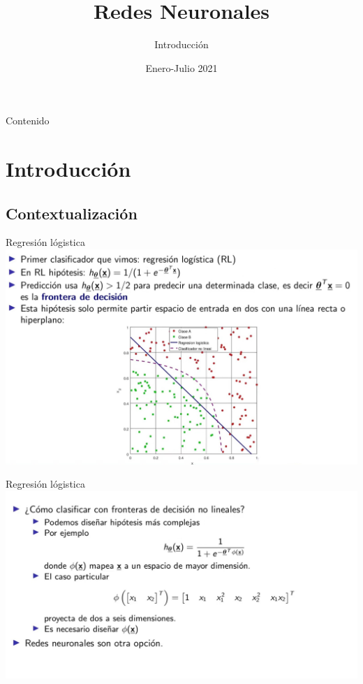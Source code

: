 \documentclass[8pt]{beamer}  %
\title{{\color{aa}\Huge\adfbullet{9}} Redes Neuronales} %
\subtitle{Introducción \textattachfile{Template.tex}{(TeX)}} %
\date{Enero-Julio 2021}
\begin{document}
\frame{\titlepage} %

\setlength{\abovedisplayskip}{0pt}
\setlength{\belowdisplayskip}{0pt}
\setlength{\abovedisplayshortskip}{0pt}
\setlength{\belowdisplayshortskip}{0pt}  %

\begin{frame}{Contenido} 
   \tableofcontents
\end{frame}
\section{Introducción}
\subsection{Contextualización}
\begin{frame}{Regresión lógistica}
	\includegraphics[width=\textwidth]{im1}
\end{frame}
\begin{frame}{Regresión lógistica}
	\includegraphics[width=\textwidth]{im2}
\end{frame}
\end{document}
